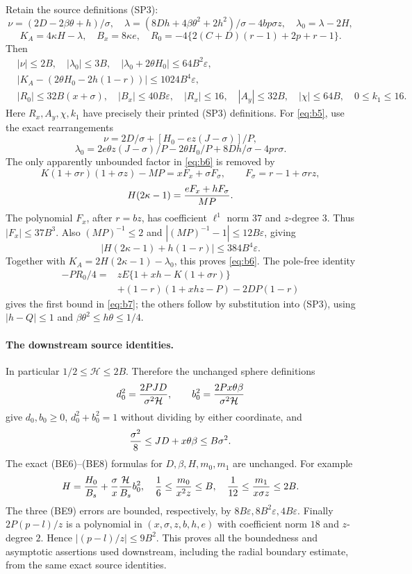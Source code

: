 \documentclass[10pt]{article}
\newcommand{\eps}{\varepsilon}
\begin{document}
Retain the source definitions (SP3):
\[
 \nu=(2D-2\beta\theta+h)/\sigma,\quad
 \lambda=(8Dh+4\beta\theta^2+2h^2)/\sigma-4bp\sigma z,
 \quad\lambda_0=\lambda-2H,
\]
\[
 K_A=4\kappa H-\lambda,\quad B_x=8\kappa e,\quad
 R_0=-4\{2(C+D)(r-1)+2p+r-1\}.
\]
Then
\begin{align}
 &|\nu|\le2B,\quad |\lambda_0|\le3B,
 \quad |\lambda_0+2\theta H_0|\le64B^2\eps,\label{eq:b5}\\
 &|K_A-(2\theta H_0-2h(1-r))|\le1024B^4\eps,\label{eq:b6}\\
 &|R_0|\le32B(x+\sigma),\quad |B_x|\le40B\eps,
 \quad |R_x|\le16,\quad |A_y|\le32B,
 \quad |\chi|\le64B,\quad 0\le k_1\le16.\label{eq:b7}
\end{align}
Here $R_x,A_y,\chi,k_1$ have precisely their printed (SP3) definitions.
For \eqref{eq:b5}, use the exact rearrangements
\[
 \nu=2D/\sigma+[H_0-ez(J-\sigma)]/P,
\]
\[
 \lambda_0=2e\theta z(J-\sigma)/P-2\theta H_0/P
                                      +8Dh/\sigma-4pr\sigma.
\]
The only apparently unbounded factor in \eqref{eq:b6} is removed by
\[
 K(1+\sigma r)(1+\sigma z)-MP=xF_x+\sigma F_\sigma,
 \qquad F_\sigma=r-1+\sigma rz,
\]
\[
 H(2\kappa-1)={eF_x+hF_\sigma\over MP}.
\]
The polynomial $F_x$, after $r=bz$, has coefficient $\ell^1$ norm
$37$ and $z$-degree $3$. Thus $|F_x|\le37B^3$.
Also $(MP)^{-1}\le2$ and $|(MP)^{-1}-1|\le12B\eps$, giving
\[
 |H(2\kappa-1)+h(1-r)|\le384B^4\eps.
\]
Together with $K_A=2H(2\kappa-1)-\lambda_0$, this proves
\eqref{eq:b6}. The pole-free identity
\[
\begin{split}
 -PR_0/4={}&zE\{1+xh-K(1+\sigma r)\}\\
 &+(1-r)(1+xhz-P)-2DP(1-r)
\end{split}
\]
gives the first bound in \eqref{eq:b7}; the others follow by
substitution into (SP3), using $|h-Q|\le1$ and
$\beta\theta^2\le h\theta\le1/4$.

\paragraph{The downstream source identities.}
In particular $1/2\le\mathcal H\le2B$. Therefore the unchanged
sphere definitions
\[
 d_0^2={2PJD\over\sigma^2\mathcal H},\qquad
 b_0^2={2Px\theta\beta\over\sigma^2\mathcal H}
\]
give $d_0,b_0\ge0$, $d_0^2+b_0^2=1$ without dividing by either
coordinate, and
\[
 {\sigma^2\over8}\le JD+x\theta\beta\le B\sigma^2.
\]
The exact (BE6)--(BE8) formulas for $D,\beta,H,m_0,m_1$ are unchanged.
For example
\[
 H={H_0\over B_s}+{\sigma\over x}{\mathcal H\over B_s}b_0^2,
 \quad {1\over6}\le{m_0\over x^2z}\le B,
 \quad {1\over12}\le{m_1\over x\sigma z}\le2B.
\]
The three (BE9) errors are bounded, respectively, by
$8B\eps,8B^2\eps,4B\eps$. Finally $2P(p-l)/z$ is a polynomial
in $(x,\sigma,z,b,h,e)$ with coefficient norm $18$ and $z$-degree
$2$. Hence $|(p-l)/z|\le9B^2$. This proves all the boundedness and
asymptotic assertions used downstream, including the radial boundary
estimate, from the same exact source identities.
\end{document}

